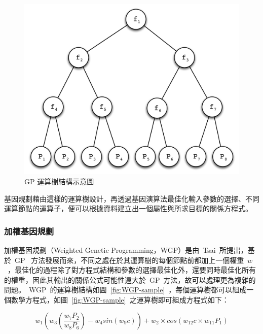 \begin{figure}[hbtp]
  \begin{center}
    \includegraphics[width=1.0\textwidth]{figures/gp-struct.pdf}
    \caption{GP 運算樹結構示意圖} 
    \label{fig:GP-struct}
  \end{center}
\end{figure}

基因規劃藉由這樣的運算樹設計，再透過基因演算法最佳化輸入參數的選擇、不同運算節點的運算子，便可以根據資料建立出一個屬性與所求目標的關係方程式。

\subsubsection{加權基因規劃}

加權基因規劃（Weighted Genetic Programming，WGP）是由~Tsai\cite{tsai2011predicting}~所提出，基於~GP~ 方法發展而來，不同之處在於其運算樹的每個節點前都加上一個權重~$w$~，最佳化的過程除了對方程式結構和參數的選擇最佳化外，還要同時最佳化所有的權重，因此其輸出的關係公式可能性遠大於~GP~方法，故可以處理更為複雜的問題。~WGP~的運算樹結構如圖~\ref{fig:WGP-sample}~，每個運算樹都可以組成一個數學方程式，如圖~\ref{fig:WGP-sample}~之運算樹即可組成方程式如下：

\begin{equation} w_1(w_3(\dfrac{w_7P_2}{w_8P_6}) - w_4sin(w_9c))+w_2 \times cos(w_{12}c \times w_{11}P_1) \label{eq:WGP-sample}\end{equation} 


